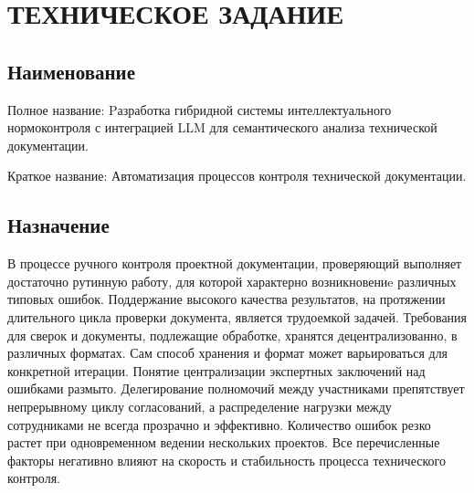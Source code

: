 \section{ТЕХНИЧЕСКОЕ ЗАДАНИЕ}

\subsection{Наименование}

Полное название: Pазработка гибридной системы интеллектуального нормоконтроля с интеграцией LLM для семантического анализа технической документации.

Краткое название: Автоматизация процессов контроля технической документации.

\subsection{Назначение}

В процессе ручного контроля проектной документации, 
проверяющий выполняет достаточно рутинную работу, 
для которой характерно возникновениe различных типовых ошибок. 
Поддержание высокого качества результатов, 
на протяжении длительного цикла проверки документа, является трудоемкой задачей. 
Требования для сверок и документы, подлежащие обработке, хранятся децентрализованно, в различных форматах. 
Сам способ хранения и формат может варьироваться для конкретной итерации. 
Понятие централизации экспертных заключений над ошибками размыто. 
Делегирование полномочий между участниками препятствует непрерывному циклу согласований, 
а распределение нагрузки между сотрудниками не всегда прозрачно и эффективно. 
Количество ошибок резко растет при одновременном ведении нескольких проектов. 
Все перечисленные факторы негативно влияют на скорость и стабильность процесса технического контроля. 


